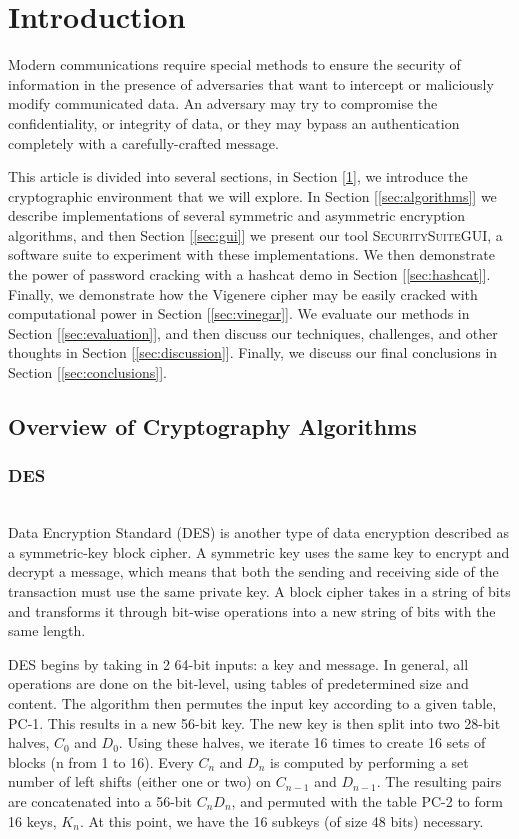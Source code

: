 \documentclass[acmlarge]{acmart}
\begin{document}
\section{Introduction}\label{sec:intro}

Modern communications require special methods to ensure the security of information in the presence of adversaries that want to intercept or maliciously modify communicated data. An adversary may try to compromise the confidentiality, or integrity of data, or they may bypass an authentication completely with a carefully-crafted message.

This article is divided into several sections, in Section [\ref{sec:intro}], we introduce the cryptographic environment that we will explore. In Section [\ref{sec:algorithms}] we describe implementations of several symmetric and asymmetric encryption algorithms, and then Section [\ref{sec:gui}] we present our tool \textsc{SecuritySuiteGUI}, a software suite to experiment with these implementations. We then demonstrate the power of password cracking with a hashcat demo in Section [\ref{sec:hashcat}]. Finally, we demonstrate how the Vigenere cipher may be easily cracked with computational power in Section [\ref{sec:vinegar}]. We evaluate our methods in Section [\ref{sec:evaluation}], and then discuss our techniques, challenges, and other thoughts in Section [\ref{sec:discussion}]. Finally, we discuss our final conclusions in Section [\ref{sec:conclusions}].

\subsection{Overview of Cryptography Algorithms}
\subsubsection{DES}
\hspace*{\fill} \\ %
Data Encryption Standard (DES) is another type of data encryption described as a symmetric-key block cipher. A symmetric key uses the same key to encrypt and decrypt a message, which means that both the sending and receiving side of the transaction must use the same private key. A block cipher takes in a string of bits and transforms it through bit-wise operations into a new string of bits with the same length. 

DES begins by taking in 2 64-bit inputs: a key and message. In general, all operations are done on the bit-level, using tables of predetermined size and content. The algorithm then permutes the input key according to a given table, PC-1. This results in a new 56-bit key. The new key is then split into two 28-bit halves, $C_{0}$ and $D_{0}$. Using these halves, we iterate 16 times to create 16 sets of blocks (n from 1 to 16). Every $C_{n}$ and  $D_{n}$ is computed by performing a set number of left shifts (either one or two) on $C_{n-1}$ and $D_{n-1}$.
 The resulting pairs are concatenated into a 56-bit $C_{n}D_{n}$, and permuted with the table PC-2 to form 16 keys, $K_{n}$. At this point, we have the 16 subkeys (of size 48 bits) necessary. 
\end{document}
